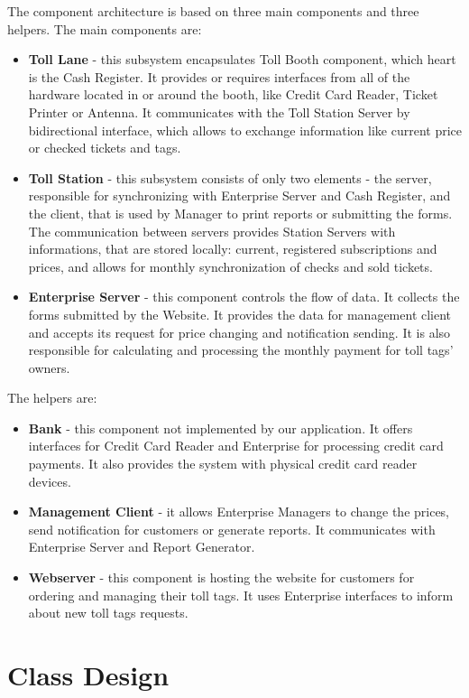 The component architecture is based on three main components and three helpers. 
The main components are:
\begin{itemize}
\item \textbf{Toll Lane} - this subsystem encapsulates Toll Booth component, which heart is the Cash Register. It provides or requires interfaces from all of the hardware located in or around the booth, like Credit Card Reader, Ticket Printer or Antenna. It communicates with the Toll Station Server by bidirectional interface, which allows to exchange information like current price or checked tickets and tags.
\item \textbf{Toll Station} - this subsystem consists of only two elements - the server, responsible for synchronizing with Enterprise Server and Cash Register, and the client, that is used by Manager to print reports or submitting the forms. The communication between servers provides Station Servers with informations, that are stored locally: current, registered subscriptions and prices, and allows for monthly synchronization of checks and sold tickets. 
\item \textbf{Enterprise Server} - this component controls the flow of data. It collects the forms submitted by the Website. It provides the data for management client and accepts its request for price changing and notification sending. It is also responsible for calculating and processing the monthly payment for toll tags' owners.
\end{itemize}
The helpers are:
\begin{itemize}
\item \textbf{Bank} - this component not implemented by our application. It offers interfaces for Credit Card Reader and Enterprise for processing credit card payments. It also provides the system with physical credit card reader devices.
\item \textbf{Management Client} - it allows Enterprise Managers to change the prices, send notification for customers or generate reports. It communicates with Enterprise Server and Report Generator. 
\item \textbf{Webserver} - this component is hosting the website for customers for ordering and managing their toll tags. It uses Enterprise interfaces to inform about new toll tags requests. 
\end{itemize}

\section{Class Design}


